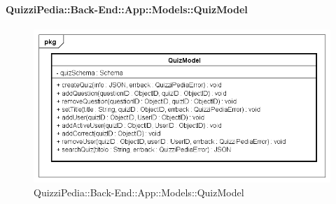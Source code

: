 \paragraph{QuizziPedia::Back-End::App::Models::QuizModel}
\label{QuizziPedia::Back-End::App::Models::QuizModel}
\begin{figure}
	\centering
	\includegraphics[scale=0.45]{UML/Package/QuizziPedia_Back-End_App_Models_quizModel.png}
	\caption{QuizziPedia::Back-End::App::Models::QuizModel}
\end{figure}




